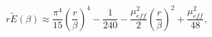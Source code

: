 \begin{equation}
r\widetilde{E}\left(\beta \right)\approx \frac{\pi ^{4}}{15}\left(\frac{r}{\beta }\right)^{4}-\frac{1}{240}-\frac{\mu _{eff}^{2}}{2}\left(\frac{r}{\beta }\right)^{2}+\frac{\mu _{eff}^{2}}{48},\end{equation}

